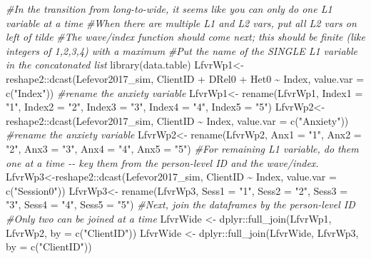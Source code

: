 \documentclass[
  11pt,
]{book}
\newenvironment{Shaded}{\begin{snugshade}}{\end{snugshade}}
\newcommand{\AttributeTok}[1]{\textcolor[rgb]{0.77,0.63,0.00}{#1}}
\newcommand{\CommentTok}[1]{\textcolor[rgb]{0.56,0.35,0.01}{\textit{#1}}}
\newcommand{\FunctionTok}[1]{\textcolor[rgb]{0.00,0.00,0.00}{#1}}
\newcommand{\NormalTok}[1]{#1}
\newcommand{\OtherTok}[1]{\textcolor[rgb]{0.56,0.35,0.01}{#1}}
\newcommand{\SpecialCharTok}[1]{\textcolor[rgb]{0.00,0.00,0.00}{#1}}
\newcommand{\StringTok}[1]{\textcolor[rgb]{0.31,0.60,0.02}{#1}}
\begin{document}
\begin{Shaded}
\begin{Highlighting}[]
\CommentTok{\#In the transition from long{-}to{-}wide, it seems like you can only do one L1 variable at a time}
\CommentTok{\#When there are multiple L1 and L2 vars, put all L2 vars on left of tilde}
\CommentTok{\#The wave/index function should come next; this should be finite (like integers of 1,2,3,4) with a maximum}
\CommentTok{\#Put the name of the SINGLE L1 variable in the concatonated list}
\FunctionTok{library}\NormalTok{(data.table)}
\NormalTok{LfvrWp1}\OtherTok{\textless{}{-}}\NormalTok{reshape2}\SpecialCharTok{::}\FunctionTok{dcast}\NormalTok{(Lefevor2017\_sim, ClientID }\SpecialCharTok{+}\NormalTok{ DRel0 }\SpecialCharTok{+}\NormalTok{ Het0 }\SpecialCharTok{\textasciitilde{}}\NormalTok{ Index, }\AttributeTok{value.var =} \FunctionTok{c}\NormalTok{(}\StringTok{"Index"}\NormalTok{))}
\CommentTok{\#rename the anxiety variable}
\NormalTok{LfvrWp1}\OtherTok{\textless{}{-}}  \FunctionTok{rename}\NormalTok{(LfvrWp1, }\AttributeTok{Index1 =} \StringTok{"1"}\NormalTok{, }\AttributeTok{Index2 =} \StringTok{"2"}\NormalTok{, }\AttributeTok{Index3 =} \StringTok{"3"}\NormalTok{, }\AttributeTok{Index4 =} \StringTok{"4"}\NormalTok{, }\AttributeTok{Index5 =} \StringTok{"5"}\NormalTok{)}
\NormalTok{LfvrWp2}\OtherTok{\textless{}{-}}\NormalTok{reshape2}\SpecialCharTok{::}\FunctionTok{dcast}\NormalTok{(Lefevor2017\_sim, ClientID }\SpecialCharTok{\textasciitilde{}}\NormalTok{ Index, }\AttributeTok{value.var =} \FunctionTok{c}\NormalTok{(}\StringTok{"Anxiety"}\NormalTok{))}
\CommentTok{\#rename the anxiety variable}
\NormalTok{LfvrWp2}\OtherTok{\textless{}{-}}  \FunctionTok{rename}\NormalTok{(LfvrWp2, }\AttributeTok{Anx1 =} \StringTok{"1"}\NormalTok{, }\AttributeTok{Anx2 =} \StringTok{"2"}\NormalTok{, }\AttributeTok{Anx3 =} \StringTok{"3"}\NormalTok{, }\AttributeTok{Anx4 =} \StringTok{"4"}\NormalTok{, }\AttributeTok{Anx5 =} \StringTok{"5"}\NormalTok{)}
\CommentTok{\#For remaining L1 variable, do them one at a time {-}{-} key them from the person{-}level ID and the wave/index.}
\NormalTok{LfvrWp3}\OtherTok{\textless{}{-}}\NormalTok{reshape2}\SpecialCharTok{::}\FunctionTok{dcast}\NormalTok{(Lefevor2017\_sim, ClientID }\SpecialCharTok{\textasciitilde{}}\NormalTok{ Index, }\AttributeTok{value.var =} \FunctionTok{c}\NormalTok{(}\StringTok{"Session0"}\NormalTok{))}
\NormalTok{LfvrWp3}\OtherTok{\textless{}{-}}  \FunctionTok{rename}\NormalTok{(LfvrWp3, }\AttributeTok{Sess1 =} \StringTok{"1"}\NormalTok{, }\AttributeTok{Sess2 =} \StringTok{"2"}\NormalTok{, }\AttributeTok{Sess3 =} \StringTok{"3"}\NormalTok{, }\AttributeTok{Sess4 =} \StringTok{"4"}\NormalTok{, }\AttributeTok{Sess5 =} \StringTok{"5"}\NormalTok{)}
\CommentTok{\#Next, join the dataframes by the person{-}level ID}
\CommentTok{\#Only two can be joined at a time}
\NormalTok{LfvrWide }\OtherTok{\textless{}{-}}\NormalTok{ dplyr}\SpecialCharTok{::}\FunctionTok{full\_join}\NormalTok{(LfvrWp1, LfvrWp2, }\AttributeTok{by =} \FunctionTok{c}\NormalTok{(}\StringTok{"ClientID"}\NormalTok{))}
\NormalTok{LfvrWide }\OtherTok{\textless{}{-}}\NormalTok{ dplyr}\SpecialCharTok{::}\FunctionTok{full\_join}\NormalTok{(LfvrWide, LfvrWp3,  }\AttributeTok{by =} \FunctionTok{c}\NormalTok{(}\StringTok{"ClientID"}\NormalTok{))}
\end{Highlighting}
\end{Shaded}
\end{document}
